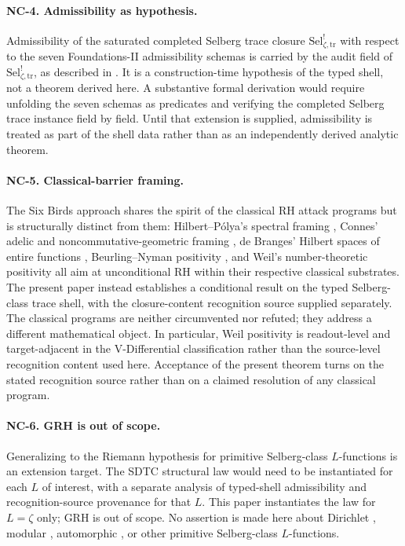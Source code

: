 \documentclass[11pt]{article}
\newcommand{\Sel}{\mathrm{Sel}^{!}_{\zeta,\mathrm{tr}}}
\theoremstyle{definition}
\begin{document}
\paragraph{NC-4. Admissibility as hypothesis.}
Admissibility of the saturated completed Selberg trace closure
\(\Sel\) with respect to the seven Foundations-II admissibility
schemas is carried by the audit field of \(\Sel\), as described in
 \cite{TsiokosFoundationsII2026}.  It is
a construction-time hypothesis of the typed shell, not a theorem
derived here.  A substantive formal derivation would require
unfolding the seven schemas as predicates and verifying the
completed Selberg trace instance field by field.  Until that
extension is supplied, admissibility is treated as part of the
shell data rather than as an independently derived analytic theorem.

\paragraph{NC-5. Classical-barrier framing.}
The Six Birds approach shares the spirit of the classical RH attack
programs but is structurally distinct from them: Hilbert--P\'olya's
spectral framing \citep{BerryKeating1990,Odlyzko1987}, Connes'
adelic and noncommutative-geometric framing
\citep{Connes1999,Connes2016}, de Branges' Hilbert spaces of entire
functions \citep{deBranges1968,deBranges1986,deBranges1994},
Beurling--Nyman positivity
\citep{Nyman1950,Beurling1955,BaezDuarte2003}, and Weil's
number-theoretic positivity \citep{Weil1952,Bombieri2000} all aim at
unconditional RH within their respective classical substrates.  The
present paper instead establishes a conditional result on the typed
Selberg-class trace shell, with the closure-content recognition
source supplied separately.  The classical programs are neither
circumvented nor refuted; they address a different mathematical
object.  In particular, Weil positivity is readout-level and
target-adjacent in the V-Differential classification rather than the
source-level recognition content used here.  Acceptance of the
present theorem turns on the stated recognition source rather than
on a claimed resolution of any classical program.

\paragraph{NC-6. GRH is out of scope.}
Generalizing to the Riemann hypothesis for primitive Selberg-class
\(L\)-functions \citep{Selberg1992,KaczorowskiPerelli1999} is an
extension target.  The SDTC structural law would need to be
instantiated for each \(L\) of interest, with a separate analysis
of typed-shell admissibility and recognition-source provenance for
that \(L\).  This paper instantiates the law for \(L=\zeta\) only;
GRH is out of scope.  No assertion is made here about
Dirichlet \citep{Davenport2000}, modular \citep{Iwaniec1997},
automorphic \citep{CogdellKimMurty2004}, or other primitive
Selberg-class \(L\)-functions.
\end{document}

